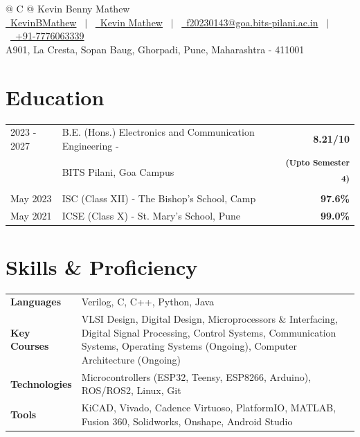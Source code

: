 \documentclass[a4paper,12pt]{article}
\begin{document}
\pagestyle{empty} 
\justifying

\begin{tabularx}{\linewidth}{@{} C @{}}
\Huge{Kevin Benny Mathew} \\[7.5pt]
\href{https://github.com/KevinBMathew}{\raisebox{-0.05\height}\faGithub\ KevinBMathew} \ $|$ \ 
\href{https://linkedin.com/in/kevin-mathew-672774249}{\raisebox{-0.05\height}\faLinkedin\ 
Kevin Mathew} \ $|$ \ 
\href{mailto:f20230143@goa.bits-pilani.ac.in}{\raisebox{-0.05\height}\faEnvelope \ f20230143@goa.bits-pilani.ac.in} \ $|$ \ 
\href{tel:+917776063339}{\raisebox{-0.05\height}\faMobile \ +91-7776063339} \\
\normalsize{A901, La Cresta, Sopan Baug, Ghorpadi, Pune, Maharashtra - 411001}
\end{tabularx}

\section{Education}
\begin{tabularx}{\linewidth}{@{}l X r@{}}	
2023 - 2027 & B.E.
(Hons.) Electronics and Communication Engineering - & \textbf{8.21/10} \\
& BITS Pilani, Goa Campus &  \textsuperscript{\textbf{(Upto Semester 4)}}\\
May 2023 & ISC (Class XII) - The Bishop's School, Camp & \textbf{97.6\%} \\
May 2021 & ICSE (Class X) - St. Mary's School, Pune & \textbf{99.0\%} \\
\end{tabularx}

\section{Skills \& Proficiency}
\begin{tabularx}{\linewidth}{@{}l X@{}}
	\textbf{Languages} & Verilog, C, C++, Python, Java \\
	\textbf{Key Courses} & VLSI Design, Digital Design, Microprocessors \& Interfacing, Digital Signal Processing, Control Systems, Communication Systems, Operating Systems (Ongoing), Computer Architecture (Ongoing)\\
	\textbf{Technologies} & Microcontrollers (ESP32, Teensy, ESP8266, Arduino), ROS/ROS2, Linux, Git \\
	\textbf{Tools} & KiCAD, Vivado, Cadence Virtuoso, PlatformIO, MATLAB, Fusion 360, Solidworks, Onshape, Android Studio \\
\end{tabularx}
\end{document}
